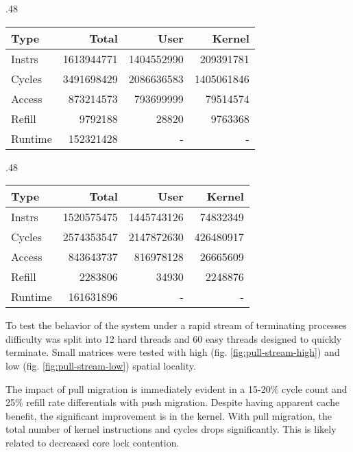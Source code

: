\documentclass[11pt]{article}
\begin{document}
\begin{figure*}
	\caption{threads with low spatial locality with a subset that quickly terminates}	
	\label{fig:pull-stream-low}				
	\begin{subtable}{.48\textwidth}
		\centering                 
		\begin{tabular}{l|rrr}       
			Type    & Total      & User       & Kernel     \\
			\hline
			Instrs  & 1613944771 & 1404552990 & 209391781  \\ 
			Cycles  & 3491698429 & 2086636583 & 1405061846 \\ 
			Access  & 873214573  & 793699999  & 79514574   \\ 
			Refill  & 9792188    & 28820      & 9763368    \\ 
			Runtime & 152321428  & -          & -          \\ 
			\hline
		\end{tabular}
		\caption{without pull migration}
	\end{subtable}
	\hfill
	\begin{subtable}{.48\textwidth}
		\centering                 
		\begin{tabular}{l|rrr}  
			Type    & Total      & User       & Kernel    \\
			\hline
			Instrs  & 1520575475 & 1445743126 & 74832349  \\ 
			Cycles  & 2574353547 & 2147872630 & 426480917 \\ 
			Access  & 843643737  & 816978128  & 26665609  \\ 
			Refill  & 2283806    & 34930      & 2248876   \\ 
			Runtime & 161631896  & -          & -         \\ 
			\hline
		\end{tabular}
		\caption{with pull migration}        
	\end{subtable}
\end{figure*}

To test the behavior of the system under a rapid stream of terminating processes difficulty was split into 12 hard threads and 60 easy threads designed to quickly terminate.  Small matrices were tested with high (fig. \ref{fig:pull-stream-high}) and low (fig. \ref{fig:pull-stream-low}) spatial locality.

The impact of pull migration is immediately evident in a 15-20\% cycle count and 25\% refill rate differentials with push migration.  Despite having apparent cache benefit, the significant improvement is in the kernel.  With pull migration, the total number of kernel instructions and cycles drops significantly.  This is likely related to decreased core lock contention.
\end{document}
